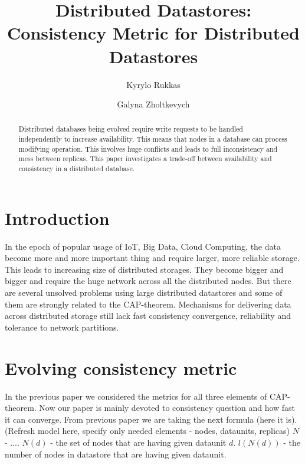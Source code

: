 \documentclass{llncs}
\begin{document}
\title{Distributed Datastores: Consistency Metric for Distributed Datastores}
\author{Kyrylo Rukkas\and Galyna Zholtkevych}
\maketitle
\begin{abstract}
Distributed databases being evolved require write requests to be handled independently to increase availability.
This means that nodes in a database can process modifying operation. This involves huge conflicts and leads to
full inconsistency and mess between replicas. This paper investigates a trade-off between availability and consistency
in a distributed database.
\end{abstract}

\section{Introduction}\label{sec:intro}
In the epoch of popular usage of IoT, Big Data, Cloud Computing, the data become more and more
important thing and require larger, more reliable storage. This leads to increasing size of distributed
storages. They become bigger and bigger and require the huge network across all the distributed nodes.
But there are several unsolved problems using large distributed datastores and some of them are strongly related
to the CAP-theorem. Mechanisms for delivering data across distributed storage still lack fast consistency convergence, reliability and tolerance to network partitions.

\section{Evolving consistency metric}

In the previous paper we considered the metrics for all three elements of CAP-theorem.
Now our paper is mainly devoted to consistency question and how fast it can converge.
From previous paper we are taking the next formula (here it is).
(Refresh model here, specify only needed elements - nodes, dataunits, replicas)
$N$ - ....
$N(d)$ - the set of nodes that are having given dataunit $d$.
$l(N(d))$ - the number of nodes in datastore that are having given dataunit.
\end{document}
